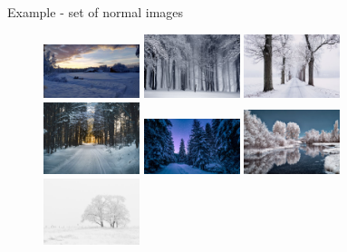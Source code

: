 \documentclass[xcolor=pdftex,dvipsnames,table,mathserif,aspectratio=169]{beamer}
\begin{document}
\begin{frame}{Example - set of normal images}

  \begin{figure}[ht]
    \centering
    \includegraphics[width=0.25\textwidth]{snow1-pexels-photo-290548.jpg}
    \includegraphics[width=0.25\textwidth]{snow2-pexels-photo-235621.jpg}
    \includegraphics[width=0.25\textwidth]{snow3-pexels-photo-839462.jpeg}
    \includegraphics[width=0.25\textwidth]{snow4-pexels-photo-688660.jpeg}
    \includegraphics[width=0.25\textwidth]{snow5-pexels-photo-773594.jpeg}
    \includegraphics[width=0.25\textwidth]{snow6-pexels-photo-1559117.jpeg}
    \includegraphics[width=0.25\textwidth]{snow7-pexels-photo-66284.jpeg}

\end{figure}
\end{frame}
\end{document}
